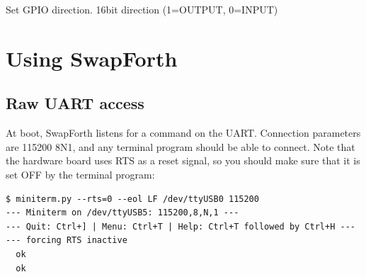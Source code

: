 \newpage
{}
 {Set GPIO direction. 16bit direction (1=OUTPUT, 0=INPUT) }





\chapter{Using SwapForth}

\section{Raw UART access}

At boot, SwapForth listens for a command on the UART. 
Connection parameters are 115200 8N1, and any terminal program should be able to connect.
 
Note that the hardware board uses RTS as a reset signal, so you should make sure that it is set OFF by the terminal program:

\begin{verbatim}
$ miniterm.py --rts=0 --eol LF /dev/ttyUSB0 115200
--- Miniterm on /dev/ttyUSB5: 115200,8,N,1 ---
--- Quit: Ctrl+] | Menu: Ctrl+T | Help: Ctrl+T followed by Ctrl+H ---
--- forcing RTS inactive
  ok
  ok
\end{verbatim}



% 
% 

